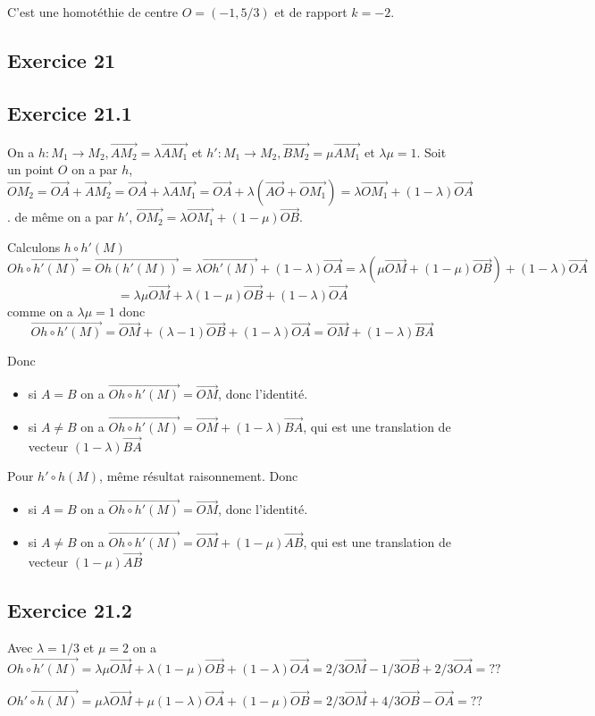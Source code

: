 \documentclass[]{book}
\theoremstyle{definition}
\newcommand{\vect}[1]{\overrightarrow{#1}}
\begin{document}
C'est une homot\'ethie de centre $O= (-1, 5/3)$ et de rapport $k=-2$.


\subsection*{Exercice 21}
\subsection*{Exercice 21.1}
On a $h: M_1 \to M_2, \vect{AM_2} = \lambda \vect{AM_1}$ et $h': M_1 \to M_2, \vect{BM_2} = \mu \vect{AM_1}$ et $\lambda\mu = 1$. Soit un point $O$ on a par $h$, $\vect{OM_2} = \vect{OA} + \vect{AM_2} = \vect{OA} + \lambda \vect{AM_1} = \vect{OA} + \lambda (\vect{AO} + \vect{OM_1}) = \lambda \vect{OM_1} + (1-\lambda)\vect{OA}$. de m\^eme on a par $h'$, $\vect{OM_2} = \lambda \vect{OM_1} + (1-\mu)\vect{OB}$.

Calculons $h \circ h'(M)$
$$
\vect{Oh \circ h'(M)} = \vect{Oh(h'(M))} = \lambda \vect{Oh'(M)} + (1-\lambda)\vect{OA} = \lambda(\mu\vect{OM} + (1-\mu)\vect{OB}) + (1-\lambda)\vect{OA}
$$
$$
= \lambda\mu\vect{OM} + \lambda(1-\mu)\vect{OB} + (1-\lambda)\vect{OA}
$$
comme on a $\lambda\mu = 1$ donc
$$
\vect{Oh \circ h'(M)} = \vect{OM} + (\lambda-1)\vect{OB} + (1-\lambda)\vect{OA} = \vect{OM} + (1-\lambda)\vect{BA}
$$

Donc
\begin{itemize}
    \item si $A=B$ on a $\vect{Oh \circ h'(M)} = \vect{OM}$, donc l'identit\'e.
    \item si $A \neq B$ on a $\vect{Oh \circ h'(M)} = \vect{OM} + (1-\lambda)\vect{BA}$, qui est une translation de vecteur $(1-\lambda)\vect{BA}$
\end{itemize}

Pour $h' \circ h(M)$, m\^eme r\'esultat raisonnement. 
Donc
\begin{itemize}
    \item si $A=B$ on a $\vect{Oh \circ h'(M)} = \vect{OM}$, donc l'identit\'e.
    \item si $A \neq B$ on a $\vect{Oh \circ h'(M)} = \vect{OM} + (1-\mu)\vect{AB}$, qui est une translation de vecteur $(1-\mu)\vect{AB}$
\end{itemize}

\subsection*{Exercice 21.2}
Avec $\lambda = 1/3$ et $\mu = 2$ on a 
$$
\vect{Oh \circ h'(M)} = \lambda\mu\vect{OM} + \lambda(1-\mu)\vect{OB} + (1-\lambda)\vect{OA} = 2/3\vect{OM} - 1/3\vect{OB}+ 2/3\vect{OA} = ??
$$

$$
\vect{Oh' \circ h(M)} = \mu\lambda\vect{OM} + \mu(1-\lambda)\vect{OA} + (1-\mu)\vect{OB} = 2/3\vect{OM} + 4/3\vect{OB}-  \vect{OA} = ??
$$
\end{document}
